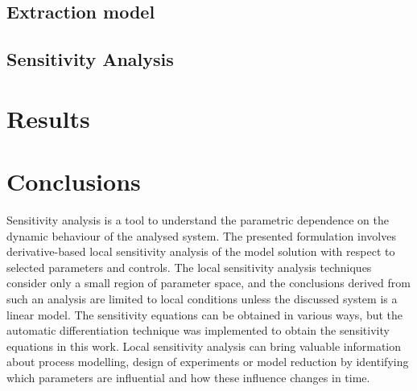 \documentclass[a4paper,fleqn]{cas-dc}
\begin{document}
\begin{comment}
	The low Mach number condition leads to the incompressible condition: $\nabla \cdot u =0$, which is valid for constant density (strict incompressible) or varying density flow. The restraint allows for the removal of acoustic waves, but also allows for large perturbations in density and/or temperature. The assumption is that the flow remains within a Mach number limit (usually less than 0.3) for any solution using such a constraint to be valid. In the 1-D case, the incompressibility condition becomes $\frac{du}{dz} = 0$, so the fluid velocity is constant.
	
\end{comment}

\subsection{Extraction model} \label{CH: Extraction_model}


%

\subsection{Sensitivity Analysis} \label{CH: Sensitivity_Analysis}


%

\section{Results}


\section{Conclusions} \label{CH: Conclusion}

Sensitivity analysis is a tool to understand the parametric dependence on the dynamic behaviour of the analysed system. The presented formulation involves derivative-based local sensitivity analysis of the model solution with respect to selected parameters and controls. The local sensitivity analysis techniques consider only a small region of parameter space, and the conclusions derived from such an analysis are limited to local conditions unless the discussed system is a linear model. The sensitivity equations can be obtained in various ways, but the automatic differentiation technique was implemented to obtain the sensitivity equations in this work. Local sensitivity analysis can bring valuable information about process modelling, design of experiments or model reduction by identifying which parameters are influential and how these influence changes in time.
\end{document}
